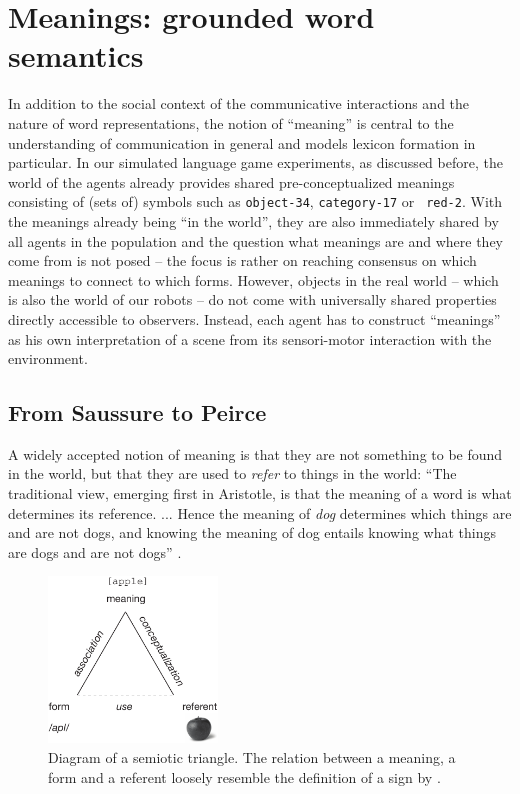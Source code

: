 \section{Meanings: grounded word semantics}
\label{s:meanings}

In addition to the social context of the communicative interactions
and the nature of word representations, the notion of ``meaning'' is
central to the understanding of communication in general and models
lexicon formation in particular. In our simulated language game
experiments, as discussed before, the world of the agents already
provides shared pre-conceptualized meanings consisting of (sets of)
symbols such as {\tt object-34}, {\tt category-17} or {\tt
  red-2}. With the meanings already being ``in the world'', they are
also immediately shared by all agents in the population and the
question what meanings are and where they come from is not posed --
the focus is rather on reaching consensus on which meanings to connect
to which forms. However, objects in the real world -- which is also
the world of our robots -- do not come with universally shared
properties directly accessible to observers. Instead, each agent has
to construct ``meanings'' as his own interpretation of a scene from
its sensori-motor interaction with the environment.



\subsection{From Saussure to Peirce}
\label{s:saussure-to-peirce}


A widely accepted notion of meaning is that they are not something to
be found in the world, but that they are used to \emph{refer} to
things in the world: ``The traditional view, emerging first in
Aristotle, is that the meaning of a word is what determines its
reference. ... Hence the meaning of \emph{dog} determines which things
are and are not dogs, and knowing the meaning of dog entails knowing
what things are dogs and are not dogs''
\citep[p. 18]{bloom00how-children}.

\begin{figure}
  \parbox{0.6\textwidth}{\centerline{\includegraphics[width=0.4\textwidth]{figures/semiotic-triangle}}}
  \caption{Diagram of a semiotic triangle. The relation between a
    meaning, a form and a referent loosely resemble the definition of
    a sign by \cite{peirce31collected}. }
\label{f:semiotic-triangle}
\end{figure}


